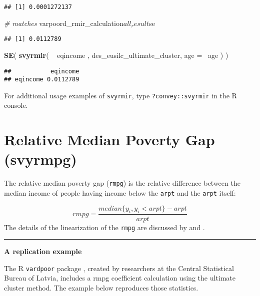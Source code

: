 \documentclass[]{book}
\newenvironment{Shaded}{\begin{snugshade}}{\end{snugshade}}
\newcommand{\KeywordTok}[1]{\textcolor[rgb]{0.13,0.29,0.53}{\textbf{{#1}}}}
\newcommand{\DataTypeTok}[1]{\textcolor[rgb]{0.13,0.29,0.53}{{#1}}}
\newcommand{\StringTok}[1]{\textcolor[rgb]{0.31,0.60,0.02}{{#1}}}
\newcommand{\CommentTok}[1]{\textcolor[rgb]{0.56,0.35,0.01}{\textit{{#1}}}}
\newcommand{\NormalTok}[1]{{#1}}
\begin{document}
\begin{verbatim}
## [1] 0.0001272137
\end{verbatim}

\begin{Shaded}
\begin{Highlighting}[]
\CommentTok{# matches}
\NormalTok{varpoord_rmir_calculation$all_result$se}
\end{Highlighting}
\end{Shaded}

\begin{verbatim}
## [1] 0.0112789
\end{verbatim}

\begin{Shaded}
\begin{Highlighting}[]
\KeywordTok{SE}\NormalTok{( }\KeywordTok{svyrmir}\NormalTok{( ~}\StringTok{ }\NormalTok{eqincome , des_eusilc_ultimate_cluster, }\DataTypeTok{age =} \NormalTok{~age ) ) }
\end{Highlighting}
\end{Shaded}

\begin{verbatim}
##           eqincome
## eqincome 0.0112789
\end{verbatim}

For additional usage examples of \texttt{svyrmir}, type
\texttt{?convey::svyrmir} in the R console.

\section{Relative Median Poverty Gap
(svyrmpg)}\label{relative-median-poverty-gap-svyrmpg}

The relative median poverty gap (\texttt{rmpg}) is the relative
difference between the median income of people having income below the
\texttt{arpt} and the \texttt{arpt} itself:

\[
rmpg = \frac{median\{y_i, y_i<arpt\}-arpt}{arpt}
\] The details of the linearization of the \texttt{rmpg} are discussed
by \citet{deville1999} and \citet{osier2009}.

\begin{center}\rule{0.5\linewidth}{\linethickness}\end{center}

\textbf{A replication example}

The R \texttt{vardpoor} package \citep{vardpoor}, created by researchers
at the Central Statistical Bureau of Latvia, includes a rmpg coefficient
calculation using the ultimate cluster method. The example below
reproduces those statistics.
\end{document}
